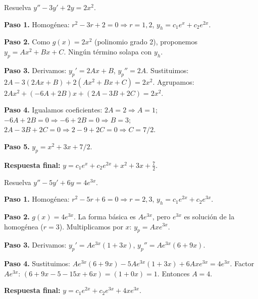 \begin{example}
Resuelva $y'' - 3y' + 2y = 2x^2$.

\begin{myproof}
\textbf{Paso 1.} Homogénea: $r^2 - 3r + 2 = 0 \Rightarrow r=1,2$, $y_h = c_1 e^x + c_2 e^{2x}$.

\textbf{Paso 2.} Como $g(x)=2x^2$ (polinomio grado 2), proponemos $y_p = Ax^2 + Bx + C$. Ningún término solapa con $y_h$.

\textbf{Paso 3.} Derivamos: $y_p' = 2Ax + B$, $y_p'' = 2A$. Sustituimos:
$2A - 3(2Ax+B) + 2(Ax^2+Bx+C) = 2x^2$.
Agrupamos: $2A x^2 + (-6A+2B)x + (2A - 3B + 2C) = 2x^2$.

\textbf{Paso 4.} Igualamos coeficientes:
$2A = 2 \Rightarrow A=1$; $-6A+2B=0 \Rightarrow -6+2B=0 \Rightarrow B=3$; $2A - 3B + 2C = 0 \Rightarrow 2 - 9 + 2C = 0 \Rightarrow C = 7/2$.

\textbf{Paso 5.} $y_p = x^2 + 3x + 7/2$.

\textbf{Respuesta final:} $\boxed{y = c_1 e^x + c_2 e^{2x} + x^2 + 3x + \frac{7}{2}.}$
\end{myproof}
\end{example}

\begin{example}
Resuelva $y'' - 5y' + 6y = 4e^{3x}$.

\begin{myproof}
\textbf{Paso 1.} Homogénea: $r^2 - 5r + 6 = 0 \Rightarrow r=2,3$, $y_h = c_1 e^{2x} + c_2 e^{3x}$.

\textbf{Paso 2.} $g(x)=4e^{3x}$. La forma básica es $A e^{3x}$, pero $e^{3x}$ es solución de la homogénea ($r=3$). Multiplicamos por $x$: $y_p = A x e^{3x}$.

\textbf{Paso 3.} Derivamos: $y_p' = A e^{3x}(1+3x)$, $y_p'' = A e^{3x}(6+9x)$.

\textbf{Paso 4.} Sustituimos:
$A e^{3x}(6+9x) - 5A e^{3x}(1+3x) + 6A x e^{3x} = 4e^{3x}$.
Factor $A e^{3x}$: $(6+9x - 5 -15x + 6x) = (1 + 0x) = 1$. Entonces $A = 4$.

\textbf{Respuesta final:} $\boxed{y = c_1 e^{2x} + c_2 e^{3x} + 4x e^{3x}.}$
\end{myproof}
\end{example}

